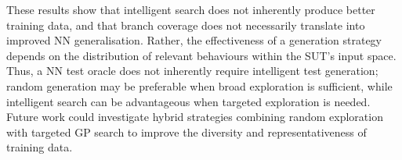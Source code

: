 \documentclass[runningheads]{llncs}
\begin{document}
These results show that intelligent search does not inherently produce better training data, and that branch coverage does not necessarily translate into improved NN generalisation. Rather, the effectiveness of a generation strategy depends on the distribution of relevant behaviours within the SUT's input space. Thus, a NN test oracle does not inherently require intelligent test generation; random generation may be preferable when broad exploration is sufficient, while intelligent search can be advantageous when targeted exploration is needed. Future work could investigate hybrid strategies combining random exploration with targeted GP search to improve the diversity and representativeness of training data.


\end{document}
